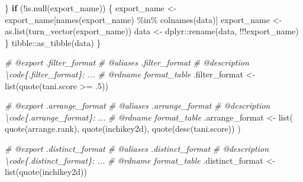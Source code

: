 \documentclass[
]{article}
\newenvironment{Shaded}{\begin{snugshade}}{\end{snugshade}}
\newcommand{\CommentTok}[1]{\textcolor[rgb]{0.56,0.35,0.01}{\textit{#1}}}
\newcommand{\ControlFlowTok}[1]{\textcolor[rgb]{0.13,0.29,0.53}{\textbf{#1}}}
\newcommand{\DecValTok}[1]{\textcolor[rgb]{0.00,0.00,0.81}{#1}}
\newcommand{\FunctionTok}[1]{\textcolor[rgb]{0.00,0.00,0.00}{#1}}
\newcommand{\NormalTok}[1]{#1}
\newcommand{\OtherTok}[1]{\textcolor[rgb]{0.56,0.35,0.01}{#1}}
\newcommand{\SpecialCharTok}[1]{\textcolor[rgb]{0.00,0.00,0.00}{#1}}
\begin{document}
\begin{Shaded}
\begin{Highlighting}[]
\NormalTok{    \}}
    \ControlFlowTok{if}\NormalTok{ (}\SpecialCharTok{!}\FunctionTok{is.null}\NormalTok{(export\_name)) \{}
\NormalTok{      export\_name }\OtherTok{\textless{}{-}}\NormalTok{ export\_name[}\FunctionTok{names}\NormalTok{(export\_name) }\SpecialCharTok{\%in\%} \FunctionTok{colnames}\NormalTok{(data)]}
\NormalTok{      export\_name }\OtherTok{\textless{}{-}} \FunctionTok{as.list}\NormalTok{(}\FunctionTok{turn\_vector}\NormalTok{(export\_name))}
\NormalTok{      data }\OtherTok{\textless{}{-}}\NormalTok{ dplyr}\SpecialCharTok{::}\FunctionTok{rename}\NormalTok{(data, }\SpecialCharTok{!!!}\NormalTok{export\_name)}
\NormalTok{    \}}
\NormalTok{    tibble}\SpecialCharTok{::}\FunctionTok{as\_tibble}\NormalTok{(data)}
\NormalTok{  \}}

\CommentTok{\#\textquotesingle{} @export .filter\_format}
\CommentTok{\#\textquotesingle{} @aliases .filter\_format}
\CommentTok{\#\textquotesingle{} @description \textbackslash{}code\{.filter\_format\}: ...}
\CommentTok{\#\textquotesingle{} @rdname format\_table}
\NormalTok{.filter\_format }\OtherTok{\textless{}{-}} 
  \FunctionTok{list}\NormalTok{(}\FunctionTok{quote}\NormalTok{(tani.score }\SpecialCharTok{\textgreater{}=}\NormalTok{ .}\DecValTok{5}\NormalTok{))}

\CommentTok{\#\textquotesingle{} @export .arrange\_format}
\CommentTok{\#\textquotesingle{} @aliases .arrange\_format}
\CommentTok{\#\textquotesingle{} @description \textbackslash{}code\{.arrange\_format\}: ...}
\CommentTok{\#\textquotesingle{} @rdname format\_table}
\NormalTok{.arrange\_format }\OtherTok{\textless{}{-}} 
  \FunctionTok{list}\NormalTok{(}
    \FunctionTok{quote}\NormalTok{(arrange.rank),}
    \FunctionTok{quote}\NormalTok{(inchikey2d),}
    \FunctionTok{quote}\NormalTok{(}\FunctionTok{desc}\NormalTok{(tani.score))}
\NormalTok{  )}

\CommentTok{\#\textquotesingle{} @export .distinct\_format}
\CommentTok{\#\textquotesingle{} @aliases .distinct\_format}
\CommentTok{\#\textquotesingle{} @description \textbackslash{}code\{.distinct\_format\}: ...}
\CommentTok{\#\textquotesingle{} @rdname format\_table}
\NormalTok{.distinct\_format }\OtherTok{\textless{}{-}} 
  \FunctionTok{list}\NormalTok{(}\FunctionTok{quote}\NormalTok{(inchikey2d))}


\end{Highlighting}
\end{Shaded}
\end{document}
